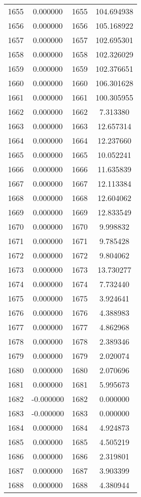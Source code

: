 \documentclass[12pt]{article}
\begin{document}
\begin{longtable}{@{}cccc@{}}
1655 & 0.000000 & 1655 & 104.694938 \\
1656 & 0.000000 & 1656 & 105.168922 \\
1657 & 0.000000 & 1657 & 102.695301 \\
1658 & 0.000000 & 1658 & 102.326029 \\
1659 & 0.000000 & 1659 & 102.376651 \\
1660 & 0.000000 & 1660 & 106.301628 \\
1661 & 0.000000 & 1661 & 100.305955 \\
1662 & 0.000000 & 1662 & 7.313380 \\
1663 & 0.000000 & 1663 & 12.657314 \\
1664 & 0.000000 & 1664 & 12.237660 \\
1665 & 0.000000 & 1665 & 10.052241 \\
1666 & 0.000000 & 1666 & 11.635839 \\
1667 & 0.000000 & 1667 & 12.113384 \\
1668 & 0.000000 & 1668 & 12.604062 \\
1669 & 0.000000 & 1669 & 12.833549 \\
1670 & 0.000000 & 1670 & 9.998832 \\
1671 & 0.000000 & 1671 & 9.785428 \\
1672 & 0.000000 & 1672 & 9.804062 \\
1673 & 0.000000 & 1673 & 13.730277 \\
1674 & 0.000000 & 1674 & 7.732440 \\
1675 & 0.000000 & 1675 & 3.924641 \\
1676 & 0.000000 & 1676 & 4.388983 \\
1677 & 0.000000 & 1677 & 4.862968 \\
1678 & 0.000000 & 1678 & 2.389346 \\
1679 & 0.000000 & 1679 & 2.020074 \\
1680 & 0.000000 & 1680 & 2.070696 \\
1681 & 0.000000 & 1681 & 5.995673 \\
1682 & -0.000000 & 1682 & 0.000000 \\
1683 & -0.000000 & 1683 & 0.000000 \\
1684 & 0.000000 & 1684 & 4.924873 \\
1685 & 0.000000 & 1685 & 4.505219 \\
1686 & 0.000000 & 1686 & 2.319801 \\
1687 & 0.000000 & 1687 & 3.903399 \\
1688 & 0.000000 & 1688 & 4.380944 \\

\end{longtable}
\end{document}
